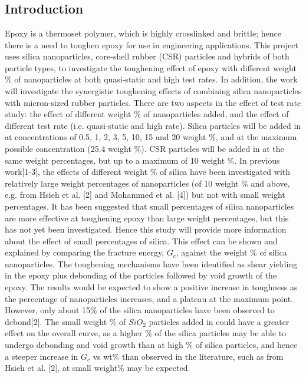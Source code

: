 \documentclass[numbers=noendperiod,chapterprefix=on]{icldt} %
\begin{document}
\newpage
\tableofcontents
\newpage
\listoftables
\newpage
\listoffigures

\newpage
{}

\chapter{}
\section{Introduction}
Epoxy is a thermoset polymer, which is highly crosslinked and brittle; hence there is a need to toughen epoxy for use in engineering applications. This project uses silica nanoparticles, core-shell rubber (CSR) particles and hybrids of both particle types, to investigate the toughening effect of epoxy with different weight \% of nanoparticles at both quasi-static and high test rates. In addition, the work will investigate the synergistic toughening effects of combining silica nanoparticles with micron-sized rubber particles. 
There are two aspects in the effect of test rate study: the effect of different weight \% of nanoparticles added, and the effect of different test rate (i.e. quasi-static and high rate). Silica particles will be added in at concentrations of 0.5, 1, 2, 3, 5, 10, 15 and 20 weight \%, and at the maximum possible concentration (25.4 weight \%). CSR particles will be added in at the same weight percentages, but up to a maximum of 10 weight \%. In previous work[1-3], the effects of different weight \% of silica have been investigated with relatively large weight percentages of nanoparticles (of 10 weight \% and above, e.g. from Hsieh et al. [2] and Mohammed et al. [4]) but not with small weight percentages. It has been suggested that small percentages of silica nanoparticles are more effective at toughening epoxy than large weight percentages, but this has not yet been investigated. Hence this study will provide more information about the effect of small percentages of silica. This effect can be shown and explained by comparing the fracture energy, $G_c$, against the weight \% of silica nanoparticles. The toughening mechanisms have been identified as shear yielding in the epoxy plus debonding of the particles followed by void growth of the epoxy. The results would be expected to show a positive increase in toughness as the percentage of nanoparticles increases, and a plateau at the maximum point. However, only about 15\% of the silica nanoparticles have been observed to debond[2]. The small weight \% of $SiO_2$ particles added in could have a greater effect on the overall curve, as a higher \% of the silica particles may be able to undergo debonding and void growth than at high \% of silica particles, and hence a steeper increase in $G_c$ vs wt\% than observed in the literature, such as from Hsieh et al. [2], at small weight\% may be expected.
\end{document}
